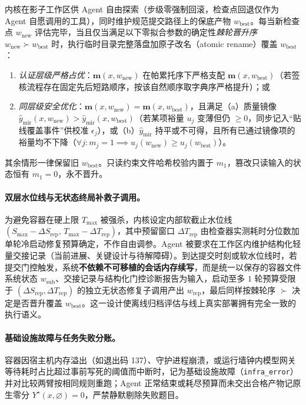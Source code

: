 \documentclass[UTF8,a4paper,10.5pt]{ctexart}
\begin{document}
内核在影子工作区供 Agent 自由探索（步级零强制回滚，检查点回退仅作为 Agent 自愿调用的工具），同时维护规范提交路径上的保底产物 $w_{\mathrm{best}}$。每当新检查点 $w_{\mathrm{new}}$ 评估完毕，当且仅当满足以下零拟合参数的确定性\emph{棘轮晋升序} $w_{\mathrm{new}}\succ w_{\mathrm{best}}$ 时，执行临时目录完整落盘加原子改名（atomic rename）覆盖 $w_{\mathrm{best}}$：
\begin{enumerate}
  \item \emph{认证层级严格占优}：$\mathbf{m}(x,w_{\mathrm{new}})$ 在帕累托序下严格支配 $\mathbf{m}(x,w_{\mathrm{best}})$（若签核流程存在固定先后短路顺序，按该自然顺序取字典序严格提升）；或
  \item \emph{同层级安全优化}：$\mathbf{m}(x,w_{\mathrm{new}})=\mathbf{m}(x,w_{\mathrm{best}})$，且满足（a）质量镜像 $\hat{y}_{\mathrm{mir}}(x,w_{\mathrm{new}})>\hat{y}_{\mathrm{mir}}(x,w_{\mathrm{best}})$（若某项裕量 $u_j$ 变薄但仍 $\ge 0$，同步记入“贴线覆盖事件”供校准 $\epsilon_j$），或（b）$\hat{y}_{\mathrm{mir}}$ 持平或不可得，且所有已通过镜像项的裕量均不下降（$\forall j: m_j=1 \implies u_j(w_{\mathrm{new}})\ge u_j(w_{\mathrm{best}})$）。
\end{enumerate}
其余情形一律保留旧 $w_{\mathrm{best}}$。只读约束文件哈希校验内置于 $m_1$，篡改只读输入的状态恒有 $m_1=0$，永不晋升。

\paragraph{双层水位线与无状态终局补救子调用。}
为避免容器在硬上限 $T_{\max}$ 被强杀，内核设定内部软截止水位线 $(S_{\max}-\Delta S_{\mathrm{rep}},\, T_{\max}-\Delta T_{\mathrm{rep}})$，其中预留窗口 $\Delta T_{\mathrm{rep}}$ 由检查器实测耗时分位数加单轮冷启动修复预算确定，不作自由调参。Agent 被要求在工作区内维护结构化轻量交接记录（当前进展、关键设计与待解障碍）。到达提交时刻或软水位线时，若提交门控触发，系统\textbf{不依赖不可移植的会话内存续写}，而是统一以保存的容器文件系统状态 $w_{\mathrm{sub}}$、交接记录与结构化门控诊断报告为输入，启动至多 $1$ 轮预算受限于 $(\Delta S_{\mathrm{rep}}, \Delta T_{\mathrm{rep}})$ 的独立无状态修复子调用产出 $w_{\mathrm{rep}}$，最后同样按棘轮序 $\succ$ 决定是否晋升覆盖 $w_{\mathrm{best}}$。这一设计使离线归档评估与线上真实部署拥有完全一致的执行语义。

\paragraph{基础设施故障与任务失败分账。}
容器因宿主机内存溢出（如退出码 137）、守护进程崩溃，或运行墙钟内模型网关等待耗时占比超过事前写死的阈值而中断时，记为基础设施故障（\texttt{infra\_error}）并对比较两臂按相同规则重跑；Agent 正常结束或耗尽预算而未交出合格产物记原生零分 $Y^\star(x,\varnothing)=0$，严禁静默剔除失败题目。
\end{document}
